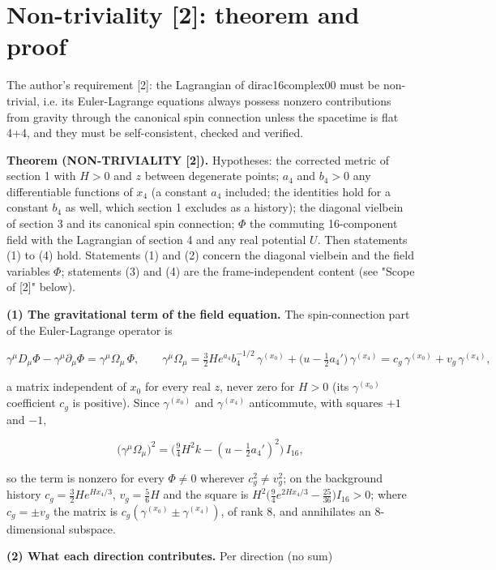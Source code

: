 \documentclass[11pt]{article}
\begin{document}
\section{Non-triviality [2]: theorem and proof}

The author's requirement [2]: the Lagrangian of dirac16complex00 must be non-trivial, i.e. its Euler-Lagrange equations always possess nonzero contributions from gravity through the canonical spin connection unless the spacetime is flat 4+4, and they must be self-consistent, checked and verified.

\textbf{Theorem (NON-TRIVIALITY [2]).} Hypotheses: the corrected metric of section 1 with $H > 0$ and $z$ between degenerate points; $a_4$ and $b_4 > 0$ any differentiable functions of $x_4$ (a constant $a_4$ included; the identities hold for a constant $b_4$ as well, which section 1 excludes as a history); the diagonal vielbein of section 3 and its canonical spin connection; $\Phi$ the commuting 16-component field with the Lagrangian of section 4 and any real potential $U$. Then statements (1) to (4) hold. Statements (1) and (2) concern the diagonal vielbein and the field variables $\Phi$; statements (3) and (4) are the frame-independent content (see "Scope of [2]" below).

\textbf{(1) The gravitational term of the field equation.} The spin-connection part of the Euler-Lagrange operator is

\[
\gamma^\mu D_\mu\Phi - \gamma^\mu\partial_\mu\Phi = \gamma^\mu\Omega_\mu\,\Phi, \qquad \gamma^\mu\Omega_\mu = \tfrac32He^{a_4}b_4^{-1/2}\,\gamma^{(x_0)} + \big(u - \tfrac12a_4'\big)\,\gamma^{(x_4)} = c_g\,\gamma^{(x_0)} + v_g\,\gamma^{(x_4)} ,
\]

a matrix independent of $x_0$ for every real $z$, never zero for $H > 0$ (its $\gamma^{(x_0)}$ coefficient $c_g$ is positive). Since $\gamma^{(x_0)}$ and $\gamma^{(x_4)}$ anticommute, with squares $+1$ and $-1$,

\[
\big(\gamma^\mu\Omega_\mu\big)^2 = \big(\tfrac94H^2k - (u - \tfrac12a_4')^2\big)\,I_{16} ,
\]

so the term is nonzero for every $\Phi \ne 0$ wherever $c_g^2 \ne v_g^2$; on the background history $c_g = \tfrac32He^{Hx_4/3}$, $v_g = \tfrac56H$ and the square is $H^2\big(\tfrac94e^{2Hx_4/3} - \tfrac{25}{36}\big)I_{16} > 0$; where $c_g = \pm v_g$ the matrix is $c_g(\gamma^{(x_0)} \pm \gamma^{(x_4)})$, of rank 8, and annihilates an 8-dimensional subspace.

\textbf{(2) What each direction contributes.} Per direction (no sum)
\end{document}
